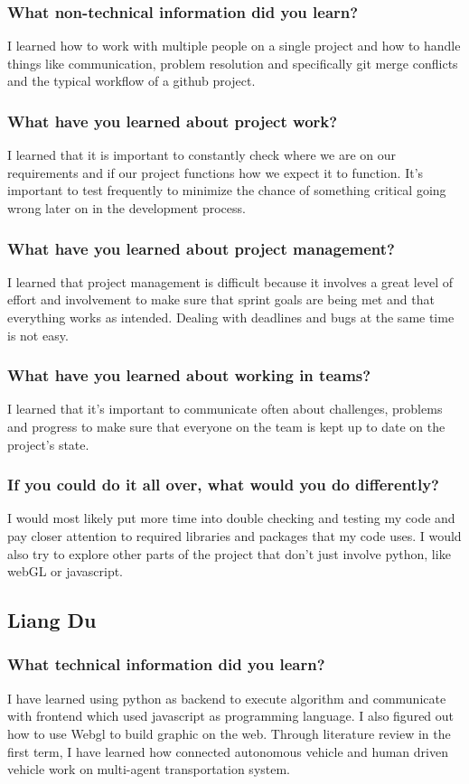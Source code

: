 \documentclass[onecolumn, draftclsnofoot,10pt, compsoc]{IEEEtran}
\begin{document}
\subsubsection{What non-technical information did you learn?}
I learned how to work with multiple people on a single project and how to handle things like communication, problem resolution and specifically git merge conflicts and the typical workflow of a github project.
\subsubsection{What have you learned about project work?}
I learned that it is important to constantly check where we are on our requirements and if our project functions how we expect it to function.
It’s important to test frequently to minimize the chance of something critical going wrong later on in the development process.
\subsubsection{What have you learned about project management?}
I learned that project management is difficult because it involves a great level of effort and involvement to make sure that sprint goals are being met and that everything works as intended.
Dealing with deadlines and bugs at the same time is not easy.
\subsubsection{What have you learned about working in teams?}
I learned that it’s important to communicate often about challenges, problems and progress to make sure that everyone on the team is kept up to date on the project’s state.
\subsubsection{If you could do it all over, what would you do differently?}
I would most likely put more time into double checking and testing my code and pay closer attention to required libraries and packages that my code uses.
I would also try to explore other parts of the project that don’t just involve python, like webGL or javascript.
\subsection{Liang Du}
\subsubsection{What technical information did you learn?}
I have learned using python as backend to execute algorithm and communicate with frontend which used javascript as programming language.
I also figured out how to use Webgl to build graphic on the web.
Through literature review in the first term, I have learned how connected autonomous vehicle and human driven vehicle work on multi-agent transportation system.
\end{document}
